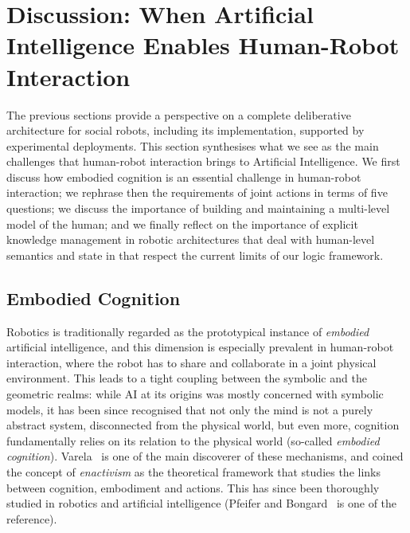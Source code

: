 \documentclass[preprint,3p,times]{elsarticle}
\begin{document}


\section{Discussion: When Artificial Intelligence Enables Human-Robot
Interaction}
\label{sect|discussion}

The previous sections provide a perspective on a complete deliberative
architecture for social robots, including its implementation, supported
by experimental deployments. This section synthesises what we
see as the main challenges that human-robot interaction brings to Artificial
Intelligence.  We first discuss how embodied cognition is an essential challenge
in human-robot interaction; we rephrase then the requirements of joint actions
in terms of five questions; we discuss the importance of building and
maintaining a multi-level model of the human; and we finally reflect on the
importance of explicit knowledge management in robotic architectures that deal
with human-level semantics and state in that respect the current limits of our
logic framework.

\subsection{Embodied Cognition}

Robotics is traditionally regarded as the prototypical instance of
\emph{embodied} artificial intelligence, and this dimension is especially
prevalent in human-robot interaction, where the robot has to share and
collaborate in a joint physical environment.  This leads to a tight coupling
between the symbolic and the geometric realms: while AI at its origins was
mostly concerned with symbolic models, it has been since recognised that not
only the mind is not a purely abstract system, disconnected from the physical
world, but even more, cognition fundamentally relies on its relation to the
physical world (so-called \emph{embodied cognition}). Varela~\cite{Varela1992}
is one of the main discoverer of these mechanisms, and coined the concept of
\emph{enactivism} as the theoretical framework that studies the links between
cognition, embodiment and actions.  This has since been thoroughly studied in
robotics and artificial intelligence (Pfeifer and
Bongard~\cite{pfeifer2007body} is one of the reference).
\end{document}
